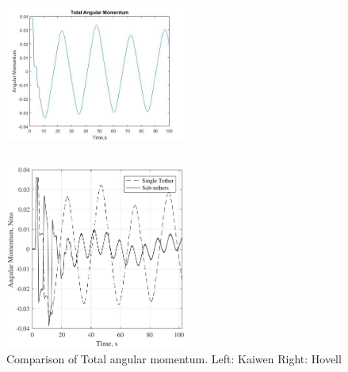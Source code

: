 \begin{figure}[htbp]
\centering
\begin{minipage}[t]{0.48\textwidth}
\centering
\includegraphics[width=6cm,height=6cm]{fig/simulation/ThrustStable/Totalangularmomentum.jpg}
\end{minipage}
\begin{minipage}[t]{0.48\textwidth}
\centering
\includegraphics[width=6cm,height=6cm]{fig/simulation/ThrustStable/Totalangularmomentumsample.jpg}
\end{minipage}
\caption{Comparison of Total angular momentum.		Left: Kaiwen	Right: Hovell}
\end{figure}

